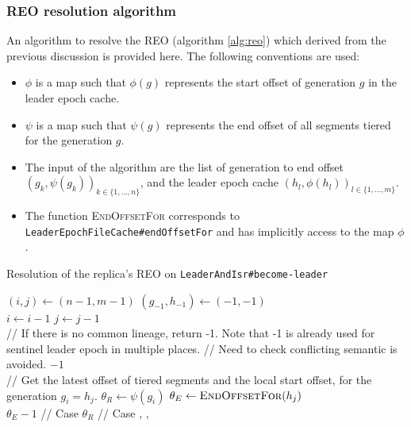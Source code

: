 \documentclass{article}
\newcommand*\circled[1]{\tikz[baseline=(char.base)]{
		\node[shape=circle,draw,inner sep=1pt] (char) {#1};}}
\begin{document}
\subsubsection{REO resolution algorithm}

An algorithm to resolve the REO (algorithm \ref{alg:reo}) which derived from the previous discussion is provided here. The following conventions are used:

\begin{itemize}
	\item $\phi$ is a map such that $\phi(g)$ represents the start offset of generation $g$ in the leader epoch cache.
	\item $\psi$ is a map such that $\psi(g)$ represents the end offset of all segments tiered for the generation $g$.
	\item The input of the algorithm are the list of generation to end offset $(g_k, \psi(g_k))_{k \in \{1,...,n\}}$, and the leader epoch cache $(h_l, \phi(h_l))_{l \in \{1,...,m\}}$.
	\item The function \textsc{EndOffsetFor} corresponds to \texttt{LeaderEpochFileCache\#endOffsetFor} and has implicitly access to the map $\phi$.
\end{itemize} 

\begin{algorithm}[h!]
	\caption{Resolution of the replica's REO on \texttt{LeaderAndIsr\#become-leader}}
	\label{alg:reo}
	
	\begin{algorithmic}[1]
			\State	$(i,j) \leftarrow (n-1,m-1)$
			\State	$(g_{-1}, h_{-1}) \leftarrow (-1,-1)$
			\\
					\State $i \leftarrow i - 1$
				\EndWhile
					\State $j \leftarrow j - 1$
				\EndWhile
			\EndWhile
			\\
			\State // If there is no common lineage, return -1. Note that -1 is already used for sentinel leader epoch in multiple places.
			\State // Need to check conflicting semantic is avoided.
				\State \Return $-1$
			\EndIf
			\\
			\State // Get the latest offset of tiered segments and the local start offset, for the generation $g_i = h_j$.
			\State $\theta_R \leftarrow \psi(g_i)$
			\State $\theta_E \leftarrow  \textsc{EndOffsetFor}(h_j)$
			\\
			\State \Return $\theta_E - 1$ // Case \circled{C}
			\Else
			\State \Return $\theta_R$ // Case \circled{A}, \circled{B}, \circled{D}
			\EndIf
			\\
		\EndFunction
	\end{algorithmic}	
\end{algorithm}
\end{document}
